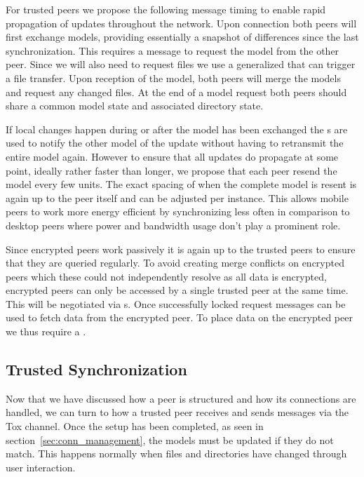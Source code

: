 For trusted peers we propose the following message timing to enable rapid propagation of updates throughout the network.
Upon connection both peers will first exchange models, providing essentially a snapshot of differences since the last synchronization.
This requires a message to request the model from the other peer.
Since we will also need to request files we use a generalized  that can trigger a file transfer.
Upon reception of the model, both peers will merge the models and request any changed files.
At the end of a model request both peers should share a common model state and associated directory state.

If local changes happen during or after the model has been exchanged the s are used to notify the other model of the update without having to retransmit the entire model again.
However to ensure that all updates do propagate at some point, ideally rather faster than longer, we propose that each peer resend the model every few units.
The exact spacing of when the complete model is resent is again up to the peer itself and can be adjusted per instance.
This allows mobile peers to work more energy efficient by synchronizing less often in comparison to desktop peers where power and bandwidth usage don't play a prominent role.

Since encrypted peers work passively it is again up to the trusted peers to ensure that they are queried regularly.
To avoid creating merge conflicts on encrypted peers which these could not independently resolve as all data is encrypted, encrypted peers can only be accessed by a single trusted peer at the same time.
This will be negotiated via s.
Once successfully locked request messages can be used to fetch data from the encrypted peer.
To place data on the encrypted peer we thus require a .

\subsection{Trusted Synchronization}
\label{sub:Trusted Synchronization}

Now that we have discussed how a peer is structured and how its connections are handled, we can turn to how a trusted peer receives and sends messages via the Tox channel.
Once the setup has been completed, as seen in section~\ref{sec:conn_management}, the models must be updated if they do not match.
This happens normally when files and directories have changed through user interaction.

